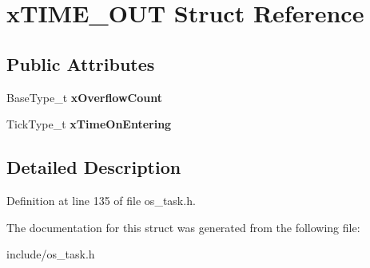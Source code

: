 \hypertarget{structxTIME__OUT}{}\section{x\+T\+I\+M\+E\+\_\+\+O\+UT Struct Reference}
\label{structxTIME__OUT}
\subsection*{Public Attributes}
\begin{DoxyCompactItemize}
\item 
\mbox{\label{structxTIME__OUT_a9289c6f97096a9b3e3fc705d0bc5a160}} 
Base\+Type\+\_\+t {\bfseries x\+Overflow\+Count}
\item 
\mbox{\label{structxTIME__OUT_a3464939ca050f7bcc6ffe0d8d3766337}} 
Tick\+Type\+\_\+t {\bfseries x\+Time\+On\+Entering}
\end{DoxyCompactItemize}


\subsection{Detailed Description}


Definition at line 135 of file os\+\_\+task.\+h.



The documentation for this struct was generated from the following file\+:\begin{DoxyCompactItemize}
\item 
include/os\+\_\+task.\+h\end{DoxyCompactItemize}
